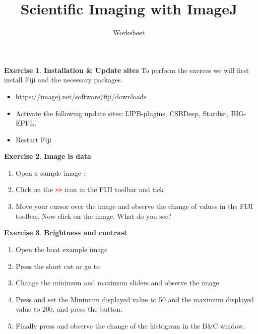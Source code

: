 \documentclass[xcolor=table,DIV=19,twocolumn]{scrartcl}
\title{Scientific Imaging with ImageJ}
\subtitle{Worksheet}
\date{}
\theoremstyle{definition}
\newtheorem{exercice}{Exercise}
\begin{document}
\maketitle

\begin{exercice} \textbf{Installation \& Update sites}
  To perform the exerces we will first install Fiji and the necessary packages.
  \begin{itemize}
  \item \url{https://imagej.net/software/fiji/downloads}
  \item Activate the following update sites: IJPB-plugins, CSBDeep, Stardist, BIG-EPFL, 
  \item Restart Fiji 
  \end{itemize}

\end{exercice}

\begin{exercice} \textbf{Image is data}
  \begin{enumerate}
  \item Open a sample image : 
  \item Click on the \textcolor{red}{\texttt{>>}} icon in the FIJI toolbar and tick
  \item Move your cursor over the image and observe the change of values in the FIJI toolbar. Now click on the image. What do you see?
  \end{enumerate}
\end{exercice}

\begin{exercice} \textbf{Brightness and contrast}
  \begin{enumerate}
  \item Open the boat example image 
  \item Press the short cut  or go to 
  \item Change the minimum and maximum sliders and observe the image
  \item Press  and set the Minimum displayed value to 50
    and the maximum displayed value to 200, and press the  button.
  \item Finally press  and observe the change of the
    histogram in the B\&C window.
  \end{enumerate}
\end{exercice}
\end{document}
